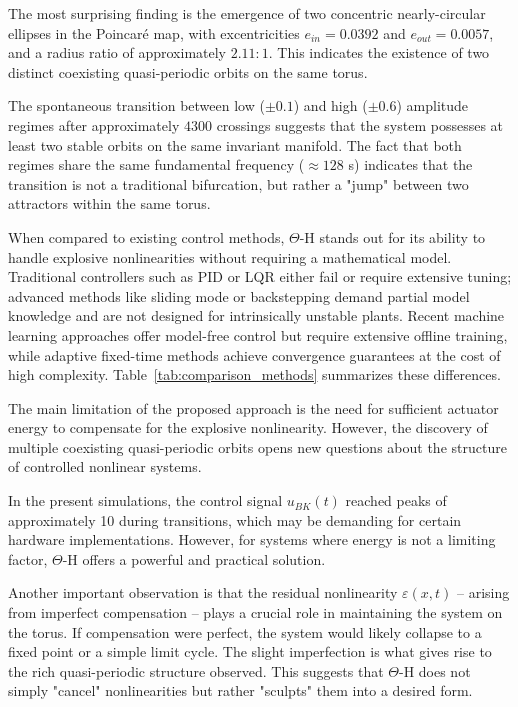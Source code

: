 \documentclass[twocolumn]{article}
\begin{document}
The most surprising finding is the emergence of two 
concentric nearly-circular ellipses in the Poincar\'e map, with 
excentricities $e_{in} = 0.0392$ and $e_{out} = 0.0057$, and a radius 
ratio of approximately $2.11:1$. This indicates the existence of 
two distinct coexisting quasi-periodic orbits on the same torus.

The spontaneous transition between low ($\pm 0.1$) and high ($\pm 0.6$) 
amplitude regimes after approximately $4300$ crossings suggests that 
the system possesses at least two stable orbits on the same invariant 
manifold. The fact that both regimes share the same fundamental 
frequency ($\approx 128$ s) indicates that the transition is not a 
traditional bifurcation, but rather a "jump" between two attractors 
within the same torus.

When compared to existing control methods, $\Theta$-H stands out for its 
ability to handle explosive nonlinearities without requiring a 
mathematical model. Traditional controllers such as PID or LQR either 
fail or require extensive tuning; advanced methods like sliding mode 
or backstepping \cite{Slotine1991} demand partial model knowledge and are not designed 
for intrinsically unstable plants. Recent machine learning approaches 
\cite{Koeglmayr2026} offer model-free control but require extensive 
offline training, while adaptive fixed-time methods \cite{Zhang2025} 
achieve convergence guarantees at the cost of high complexity. 
Table~\ref{tab:comparison_methods} summarizes these differences.

The main limitation of the proposed approach is the need for sufficient 
actuator energy to compensate for the explosive nonlinearity. However, the discovery of 
multiple coexisting quasi-periodic orbits opens new questions about 
the structure of controlled nonlinear systems.

In the present simulations, the control signal $u_{BK}(t)$ reached peaks of 
approximately 10 during transitions, which may be demanding for certain 
hardware implementations. However, for systems where energy is not a 
limiting factor, $\Theta$-H offers a powerful and practical solution.

Another important observation is that the residual nonlinearity 
$\varepsilon(x,t)$ -- arising from imperfect compensation -- plays a 
crucial role in maintaining the system on the torus. If compensation 
were perfect, the system would likely collapse to a fixed point or a 
simple limit cycle. The slight imperfection is what gives rise to the 
rich quasi-periodic structure observed. This suggests that $\Theta$-H does 
not simply "cancel" nonlinearities but rather "sculpts" them into a 
desired form.
\end{document}
